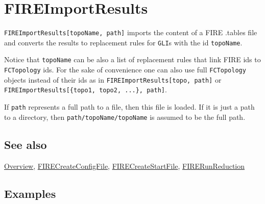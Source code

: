 \documentclass[../FeynHelpersManual.tex]{subfiles}
\begin{document}
\hypertarget{fireimportresults}{
\section{FIREImportResults}\label{fireimportresults}}

\texttt{FIREImportResults[\allowbreak{}topoName,\ \allowbreak{}path]}
imports the content of a FIRE .tables file and converts the results to
replacement rules for \texttt{GLI}s with the id \texttt{topoName}.

Notice that \texttt{topoName} can be also a list of replacement rules
that link FIRE ids to \texttt{FCTopology} ids. For the sake of
convenience one can also use full \texttt{FCTopology} objects instead of
their ids as in
\texttt{FIREImportResults[\allowbreak{}topo,\ \allowbreak{}path]} or
\texttt{FIREImportResults[\allowbreak{}\{\allowbreak{}topo1,\ \allowbreak{}topo2,\ \allowbreak{}...\},\ \allowbreak{}path]}.

If \texttt{path} represents a full path to a file, then this file is
loaded. If it is just a path to a directory, then
\texttt{path/topoName/topoName} is assumed to be the full path.

\subsection{See also}

\hyperlink{toc}{Overview},
\hyperlink{firecreateconfigfile}{FIRECreateConfigFile},
\hyperlink{firecreatestartfile}{FIRECreateStartFile},
\hyperlink{firerunreduction}{FIRERunReduction}

\subsection{Examples}

\begin{Shaded}
\begin{Highlighting}[]
\ExtensionTok{=} \OperatorTok{[\{}\OperatorTok{,} \OperatorTok{,} \OperatorTok{,} \OperatorTok{\}]}\NormalTok{;}
\end{Highlighting}
\end{Shaded}

\begin{Shaded}
\begin{Highlighting}[]
\ExtensionTok{=}\OperatorTok{[}\OperatorTok{,}\OperatorTok{]}\NormalTok{;}
\end{Highlighting}
\end{Shaded}
\end{document}
